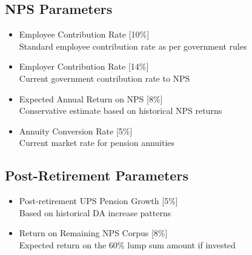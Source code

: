 \documentclass{article}
\begin{document}
\subsection{NPS Parameters}
\begin{itemize}
    \item Employee Contribution Rate [10\%] \\
          Standard employee contribution rate as per government rules
    \item Employer Contribution Rate [14\%] \\
          Current government contribution rate to NPS
    \item Expected Annual Return on NPS [8\%] \\
          Conservative estimate based on historical NPS returns
    \item Annuity Conversion Rate [5\%] \\
          Current market rate for pension annuities
\end{itemize}

\subsection{Post-Retirement Parameters}
\begin{itemize}
    \item Post-retirement UPS Pension Growth [5\%] \\
          Based on historical DA increase patterns
    \item Return on Remaining NPS Corpus [8\%] \\
          Expected return on the 60\% lump sum amount if invested
\end{itemize}
\end{document}
